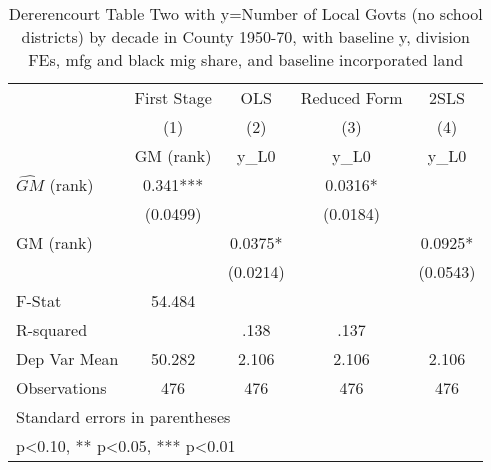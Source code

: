 \begin{table}[htbp]\centering
\def\sym#1{\ifmmode^{#1}\else\(^{#1}\)\fi}
\caption{Dererencourt Table Two with y=Number of Local Govts (no school districts) by decade in County 1950-70, with baseline y, division FEs, mfg and black mig share, and baseline incorporated land}
\begin{tabular}{l*{4}{c}}
\toprule
                    & First Stage   &         OLS   &Reduced Form   &        2SLS   \\
                    &\multicolumn{1}{c}{(1)}&\multicolumn{1}{c}{(2)}&\multicolumn{1}{c}{(3)}&\multicolumn{1}{c}{(4)}\\
                    &\multicolumn{1}{c}{GM  (rank)}&\multicolumn{1}{c}{y\_L0}&\multicolumn{1}{c}{y\_L0}&\multicolumn{1}{c}{y\_L0}\\
\midrule
$\hat{GM}$ (rank)   &       0.341***&               &      0.0316*  &               \\
                    &    (0.0499)   &               &    (0.0184)   &               \\
\addlinespace
GM  (rank)          &               &      0.0375*  &               &      0.0925*  \\
                    &               &    (0.0214)   &               &    (0.0543)   \\
\midrule
F-Stat              &      54.484   &               &               &               \\
R-squared           &               &        .138   &        .137   &               \\
Dep Var Mean        &      50.282   &       2.106   &       2.106   &       2.106   \\
Observations        &         476   &         476   &         476   &         476   \\
\bottomrule
\multicolumn{5}{l}{\footnotesize Standard errors in parentheses}\\
\multicolumn{5}{l}{\footnotesize * p<0.10, ** p<0.05, *** p<0.01}\\
\end{tabular}
\end{table}
